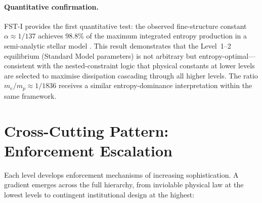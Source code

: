 \documentclass[12pt,a4paper]{article}
\theoremstyle{remark}
\begin{document}
\paragraph{Quantitative confirmation.}
FST-I provides the first quantitative test: the observed fine-structure constant $\alpha \approx 1/137$ achieves 98.8\% of the maximum integrated entropy production in a semi-analytic stellar model \citep{Geiger2026a}. This result demonstrates that the Level~1--2 equilibrium (Standard Model parameters) is not arbitrary but entropy-optimal---consistent with the nested-constraint logic that physical constants at lower levels are selected to maximise dissipation cascading through all higher levels. The ratio $m_e/m_p \approx 1/1836$ receives a similar entropy-dominance interpretation within the same framework.


\section{Cross-Cutting Pattern: Enforcement Escalation}
\label{sec:enforcement}

Each level develops enforcement mechanisms of increasing sophistication. A gradient emerges across the full hierarchy, from inviolable physical law at the lowest levels to contingent institutional design at the highest:
\end{document}
